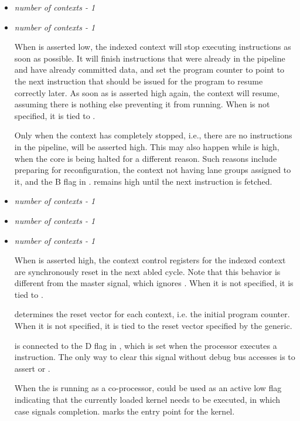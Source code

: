 \begin{itemize}
\vspace{1em}
\item {}\textit{number of contexts - 1}
\item {}\textit{number of contexts - 1}

When  is asserted low, the indexed context will stop 
executing instructions as soon as possible. It will finish instructions that 
were already in the pipeline and have already committed data, and set the 
program counter to point to the next instruction that should be issued for the 
program to resume correctly later. As soon as  is asserted
high again, the context will resume, assuming there is nothing else preventing
it from running. When  is not specified, it is tied to
.

Only when the context has completely stopped, i.e., there are no instructions in 
the pipeline, will  be asserted high. This may also happen 
while  is high, when the core is being halted for a different 
reason. Such reasons include preparing for reconfiguration, the context not 
having lane groups assigned to it, and the B flag in . 
 remains high until the next instruction is fetched.

\vspace{1em}
\item {}\textit{number of contexts - 1}
\item {}\textit{number of contexts - 1}
\item {}\textit{number of contexts - 1}

When  is asserted high, the context control registers for 
the indexed context are synchronously reset in the next abled cycle. 
Note that this behavior is different from the master  signal, which 
ignores . When it is not specified, it is tied to .

 determines the reset vector for each context, i.e. the
initial program counter. When it is not specified, it is tied to the reset
vector specified by the  generic.

 is connected to the D flag in , which is set when 
the processor executes a  instruction. The only way to clear this 
signal without debug bus accesses is to assert  or 
.

When the \rvex{} is running as a co-processor,  could be 
used as an active low flag indicating that the currently loaded kernel needs to 
be executed, in which case  signals completion.
 marks the entry point for the kernel.

\end{itemize}

